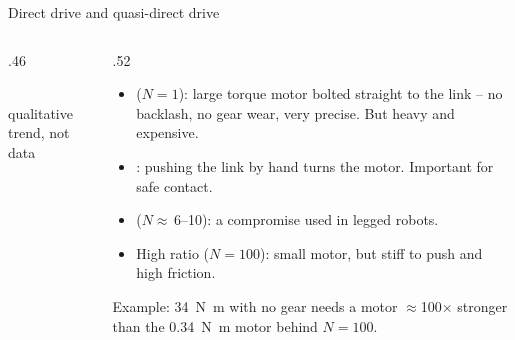 \documentclass[aspectratio=169,10pt]{beamer}
\begin{document}
\begin{frame}{Direct drive and quasi-direct drive}
\begin{columns}[T]
\begin{column}{.46\textwidth}
\centering
{}\\
{\scriptsize\color{mkGray} qualitative trend, not data}
\end{column}
\begin{column}{.52\textwidth}
\small
\begin{itemize}\setlength\itemsep{3pt}
\item {} ($N=1$): large torque motor bolted straight to the link -- no backlash, no gear wear, very precise. But heavy and expensive.
\item {}: pushing the link by hand turns the motor. Important for safe contact.
\item {} ($N\approx$\,6--10): a compromise used in legged robots.
\item High ratio ($N=100$): small motor, but stiff to push and high friction.
\end{itemize}
\begin{notebox}
Example: \SI{34}{\newton\metre} with no gear needs a motor $\approx$100$\times$ stronger than the \SI{0.34}{\newton\metre} motor behind $N=100$.
\end{notebox}
\end{column}
\end{columns}
\end{frame}
\end{document}
